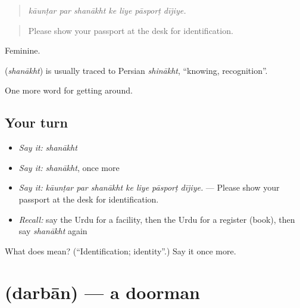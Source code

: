 \begin{quote}
      
\end{quote}

\begin{quote}
\emph{kāunṭar par shanākht ke liye pāsporṭ dījiye.}
\end{quote}

\begin{quote}
Please show your passport at the desk for identification.
\end{quote}

Feminine.

\begin{cousinweb}
\textbf{} (\emph{shanākht}) is usually traced to Persian \emph{shinākht}, \textquotedblleft{}knowing, recognition\textquotedblright{}.
\end{cousinweb}

\begin{grammarlens}[title={What you've built}]
One more word for getting around.
\end{grammarlens}

\subsection*{Your turn}
\begin{itemize}
\raggedright
  \item \emph{Say it:} \emph{shanākht}
  \item \emph{Say it:} \emph{shanākht}, once more
  \item \emph{Say it:} \emph{kāunṭar par shanākht ke liye pāsporṭ dījiye.} — Please show your passport at the desk for identification.
  \item \emph{Recall:} say the Urdu for a facility, then the Urdu for a register (book), then say \emph{shanākht} again
\end{itemize}

\begin{tcolorbox}[breakable,colback=teal!4,colframe=teal!35!black,title={Before you move on}]
What does  mean? (\textquotedblleft{}Identification; identity\textquotedblright{}.) Say it once more.
\end{tcolorbox}
\section[\texorpdfstring{\ur{دربان} (darbān)}{دربان (darbān)}]{ (darbān) — a doorman}


